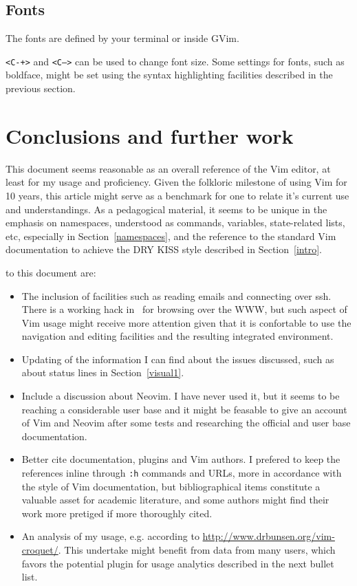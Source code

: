 \documentclass{article}
\newcommand{\ttt}[1] {
	\texttt{<#1>}}
\newcommand{\tttt}[1]{\texttt{#1}}
\begin{document}
\subsection{Fonts}
The fonts are defined by your terminal or inside GVim.
\ttt{C-+} and \ttt{C--} can be used to change font size.
Some settings for fonts, such as boldface, might be set using
the syntax highlighting facilities described in the previous section.

\section{Conclusions and further work}\label{conc}
This document seems reasonable as an overall reference of the Vim editor,
at least for my usage and proficiency.
Given the folkloric milestone of using Vim for 10 years,
this article might serve as a benchmark for one to relate
it's current use and understandings.
As a pedagogical material, it seems to be unique in the emphasis
on namespaces, understood as commands, variables, state-related lists, etc,
especially in Section~\ref{namespaces},
and the reference to the standard Vim documentation
to achieve the DRY KISS style described in Section~\ref{intro}.

 to this document are:
\begin{itemize}
  \item The inclusion of facilities such as reading emails and connecting over ssh.
    There is a working hack in~\cite{vimrc} for browsing over the WWW,
    but such aspect of Vim usage might receive more attention
    given that it is confortable to use the navigation and editing facilities
    and the resulting integrated environment.
  \item Updating of the information I can find about the issues discussed,
    such as about status lines in Section~\ref{visual1}.
  \item Include a discussion about Neovim.
    I have never used it, but it seems to be reaching a considerable user base
    and it might be feasable to give an account of Vim and Neovim
    after some tests and researching the official and user base documentation.
  \item Better cite documentation, plugins and Vim authors.
    I prefered to keep the references inline through \tttt{:h} commands
    and URLs, more in accordance with the style of Vim documentation,
    but bibliographical items constitute a valuable asset for academic literature,
    and some authors might find their work more pretiged if more
    thoroughly cited.
  \item An analysis of my usage, e.g. according to \url{http://www.drbunsen.org/vim-croquet/}.
    This undertake might benefit from data from many users,
    which favors the potential plugin for usage analytics described in the next bullet list.
\end{itemize}
\end{document}
